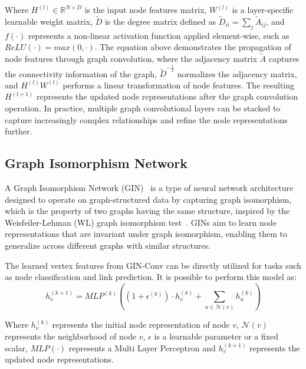 \documentclass{Configuration_Files/PoliMi3i_thesis}
\begin{document}
    Where $H^{(l)} \in \mathbb{R}^{N \times D}$ is the input node features matrix, $W^{(l)}$ is a layer-specific learnable weight matrix, $\tilde{D}$ is the degree matrix defined as $\tilde{D}_{ii} = \sum_{j} \tilde{A}_{ij}$, and $f(\cdot)$ represents a non-linear activation function applied element-wise, such as $ReLU(\cdot) = max(0, \cdot)$.
    The equation above demonstrates the propagation of node features through graph convolution, where the adjacency matrix $\tilde{A}$ captures the connectivity information of the graph, $\tilde{D}^{-\tfrac{1}{2}}$ normalizes the adjacency matrix, and $H^{(l)}  W^{(l)}$ performs a linear transformation of node features.
    The resulting $H^{(l+1)}$ represents the updated node representations after the graph convolution operation.
    In practice, multiple graph convolutional layers can be stacked to capture increasingly complex relationships and refine the node representations further.

    \subsection{Graph Isomorphism Network}
    \label{subsec:graph_isomorphism_network}%

    A Graph Isomorphism Network (GIN)~\cite{xu2019powerful, daigavane2021understanding} is a type of neural network architecture designed to operate on graph-structured data by capturing graph isomorphism, which is the property of two graphs having the same structure, inspired by the Weisfeiler-Lehman (WL) graph isomorphism test~\cite{xu2019powerful}.
    GINs aim to learn node representations that are invariant under graph isomorphism, enabling them to generalize across different graphs with similar structures.

    The learned vertex features from GIN-Conv can be directly utilized for tasks such as node classification and link prediction. It is possible to perform this model as:
    \begin{equation}
        \label{eq:gin_function}
        h_v^{(k+1)} = MLP^{(k)} \left( \left( 1 + \epsilon^{(k)} \right) \cdot h_v^{(k)} + \sum_{u \in \mathcal{N}(v)} h_u^{(k)} \right)
    \end{equation}

    Where $h_v^{(k)}$ represents the initial node representation of node $v$, $\mathcal{N}(v)$ represents the neighborhood of node $v$, $\epsilon$ is a learnable
    parameter or a fixed scalar, $MLP( \cdot )$ represents a Multi Layer Perceptron and $h_v^{(k+1)}$ represents the updated node representations.
\end{document}
